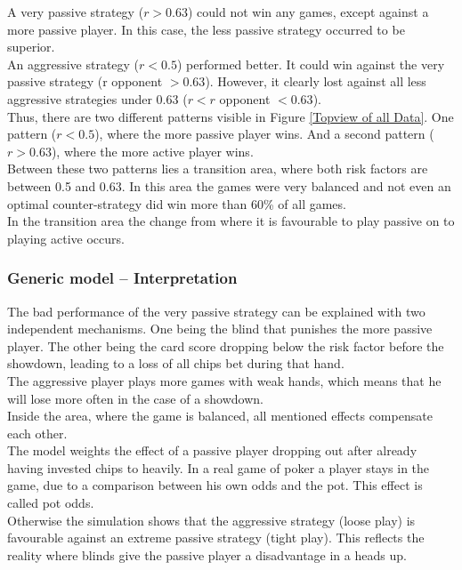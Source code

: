 \documentclass[11pt]{article}
\begin{document}
%
A very passive strategy ($r > 0.63$) could not win any games, except against a more passive player. In this case, the less passive strategy occurred to be superior.\\
%

An aggressive strategy ($r < 0.5$) performed better. It could win against the very passive strategy (r opponent $> 0.63$). However, it clearly lost against all less aggressive strategies under 0.63 ($r < r$ opponent $< 0.63$).\\

Thus, there are two different patterns visible in Figure \ref{Topview of all Data}. One pattern ($r <0.5$), where the more passive player wins. And a second pattern ($r>0.63$), where the more active player wins.\\

Between these two patterns lies a transition area, where both risk factors are between 0.5 and 0.63. In this area the games were very balanced and not even an optimal counter-strategy did win more than 60\% of all games.\\

In the transition area the change from where it is favourable to play passive on to playing active occurs.

 \subsubsection{Generic model -- Interpretation}

The bad performance of the very passive strategy can be explained with two independent mechanisms. One being the blind that punishes the more passive player. The other being the card score dropping below the risk factor before the showdown, leading to a loss of all chips bet during that hand.\\
The aggressive player plays more games with weak hands, which means that he will lose more often in the case of a showdown.\\
Inside the area, where the game is balanced, all mentioned effects compensate each other.\\

The model weights the effect of a passive player dropping out after already having invested chips to heavily. In a real game of poker a player stays in the game, due to a comparison between his own odds and the pot. This effect is called pot odds.\\
Otherwise the simulation shows that the aggressive strategy (loose play) is favourable against an extreme passive strategy (tight play). This reflects the reality where blinds give the passive player a disadvantage in a heads up.\\
\end{document}
